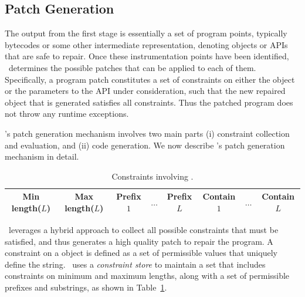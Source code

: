 \subsection{Patch Generation}
\label{sec:tool:stage2}

The output from the first stage is essentially a set of program points,
typically bytecodes or some other intermediate representation, denoting
 objects or APIs that are safe to repair. Once these
instrumentation points have been identified, \tool\ determines the
possible patches that can be applied to each of them. Specifically, a program
patch constitutes a set of constraints on either the  object or the
parameters to the  API under consideration, such that the new
repaired  object that is generated satisfies all constraints. Thus
the patched program does not throw any runtime exceptions.

\tool's patch generation mechanism involves two main parts (i) constraint
collection and evaluation, and (ii) code generation. We now describe \tool's
patch generation mechanism in detail. 


\begin{table}[t]
\centering
\caption{Constraints involving .}
\scriptsize
\setlength{\tabcolsep}{2.5pt}
\begin{tabular}{|c|c|c|c|c|c|c|c|}
\hline
Min length($L$) & Max length($L$) & Prefix $1$ & $\ldots$ & Prefix$L$ & Contain
$1$ & $\ldots$ & Contain $L$\\
\hline
\end{tabular}
\label{table:constraint}
\end{table}

 \tool\ leverages a hybrid
approach to collect all possible constraints that must be satisfied, and thus
generates a high quality patch to repair the program. A constraint on a
 object is defined as a set of permissible values that uniquely
define the string. \tool\ uses a \textit{constraint store} to maintain a set that 
includes constraints on minimum and maximum
lengths, along with a set of permissible prefixes and substrings, as shown in
Table~\ref{table:constraint}.

